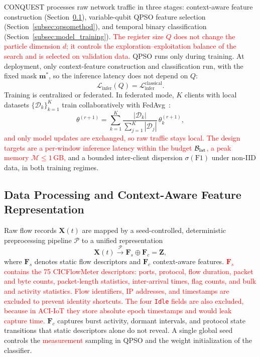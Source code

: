 \documentclass[conference]{IEEEtran}
\begin{document}
CONQUEST processes raw network traffic in three stages:
context-aware feature construction
(Section~\ref{subsec:feature_pipeline}), variable-qubit QPSO feature
selection (Section~\ref{subsec:qpsomethod}), and temporal binary
classification (Section~\ref{subsec:model_training}).
\textcolor{red}{The register size $Q$ does not change the
particle dimension $d$; it controls the exploration--exploitation
balance of the search and is selected on validation data.} QPSO runs
only during training. At deployment, only context-feature construction and
classification run, with the fixed mask $\mathbf{m}^{*}$, so the
inference latency does not depend on $Q$:
\begin{equation}
\mathcal{L}_{\text{infer}}(Q) =
\mathcal{L}_{\text{infer}}^{\text{classical}}.
\label{eq:infer_invariance}
\end{equation}
Training is centralized or federated. In federated mode, $K$ clients
with local datasets $\{\mathcal{D}_k\}_{k=1}^{K}$ train
collaboratively with FedAvg~\cite{mcmahan2017fedavg}:
\begin{equation}
\theta^{(r+1)} = \sum_{k=1}^{K}
\frac{|\mathcal{D}_k|}{\sum_{j=1}^{K}|\mathcal{D}_j|}
\,\theta_k^{(r+1)},
\label{eq:fedavg_overview}
\end{equation}
\textcolor{red}{and only model updates are exchanged, so raw
traffic stays local.} \textcolor{red}{The design targets are
a per-window inference latency within the budget
$\mathcal{B}_{\rm lat}$, a peak memory $\mathcal{M}\le1$\,GB,} and a
bounded inter-client dispersion $\sigma(\mathrm{F1})$ under non-IID
data, in both training regimes.


\subsection{Data Processing and Context-Aware Feature
            Representation}
\label{subsec:feature_pipeline}

Raw flow records $\mathbf{X}(t)$ are mapped by a seed-controlled,
deterministic preprocessing pipeline $\mathcal{P}$ to a unified
representation
\begin{equation}
\mathbf{X}(t) \xrightarrow{\mathcal{P}}
\mathbf{F}_s \oplus \mathbf{F}_c = \mathbf{Z},
\label{eq:feature_fusion}
\end{equation}
where $\mathbf{F}_s$ denotes static flow descriptors and
$\mathbf{F}_c$ context-aware features.
\textcolor{red}{$\mathbf{F}_s$ contains the 75 CICFlowMeter
descriptors: ports, protocol, flow duration, packet and byte counts,
packet-length statistics, inter-arrival times, flag counts, and bulk
and activity statistics. Flow identifiers, IP addresses, and
timestamps are excluded to prevent identity shortcuts. The four
\texttt{Idle} fields are also excluded, because in ACI-IoT they store
absolute epoch timestamps and would leak capture time.}
$\mathbf{F}_c$ captures burst activity, dormant intervals, and
protocol state transitions that static descriptors alone do not
reveal. A single global seed controls the
\textcolor{red}{measurement} sampling in QPSO and the
weight initialization of the classifier.
\end{document}
